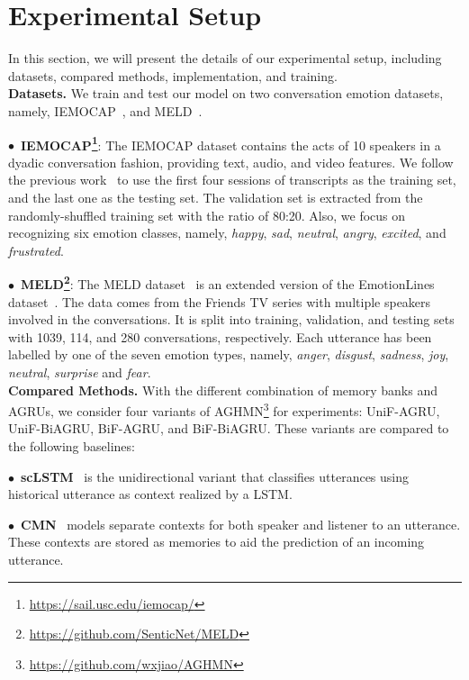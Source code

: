 \documentclass[letterpaper]{article} %
\begin{document}
\section{Experimental Setup}

In this section, we will present the details of our experimental setup, including datasets, compared methods, implementation, and training.
\\[1ex]
\noindent\textbf{Datasets.}
We train and test our model on two conversation emotion datasets, namely, IEMOCAP~\cite{DBLP:journals/lre/BussoBLKMKCLN08}, and MELD~\cite{DBLP:conf/acl/PoriaHMNCM19}.

$\bullet$~\textbf{IEMOCAP\footnote{\url{https://sail.usc.edu/iemocap/}}}:
The IEMOCAP dataset contains the acts of 10 speakers in a dyadic conversation fashion, providing text, audio, and video features. We follow the previous work~\cite{DBLP:conf/emnlp/HazarikaPMCZ18} to use the first four sessions of transcripts as the training set, and the last one as the testing set. The validation set is extracted from the randomly-shuffled training set with the ratio of 80:20. Also, we focus on recognizing six emotion classes, namely, \textit{happy}, \textit{sad}, \textit{neutral}, \textit{angry}, \textit{excited}, and \textit{frustrated}.

$\bullet$~\textbf{MELD\footnote{\url{https://github.com/SenticNet/MELD}}}:
The MELD dataset~\cite{DBLP:conf/acl/PoriaHMNCM19} is an extended version of the EmotionLines dataset~\cite{DBLP:conf/lrec/HsuCKHK18}. The data comes from the Friends TV series with multiple speakers involved in the conversations. It is split into training, validation, and testing sets with 1039, 114, and 280 conversations, respectively. Each utterance has been labelled by one of the seven emotion types, namely, \textit{anger}, \textit{disgust}, \textit{sadness}, \textit{joy}, \textit{neutral}, \textit{surprise} and \textit{fear}. 
\\[1ex]
\noindent\textbf{Compared Methods.}
With the different combination of memory banks and AGRUs, we consider four variants of AGHMN\footnote{\url{https://github.com/wxjiao/AGHMN}} for experiments: UniF-AGRU, UniF-BiAGRU, BiF-AGRU, and BiF-BiAGRU.
These variants are compared to the following baselines:

$\bullet$~\textbf{scLSTM}~\cite{DBLP:conf/acl/PoriaCHMZM17} is the unidirectional variant that classifies utterances using historical utterance as context realized by a LSTM.

$\bullet$~\textbf{CMN}~\cite{DBLP:conf/naacl/HazarikaPZCMZ18} models separate contexts for both speaker and listener to an utterance. These contexts are stored as memories to aid the prediction of an incoming utterance.
\end{document}
